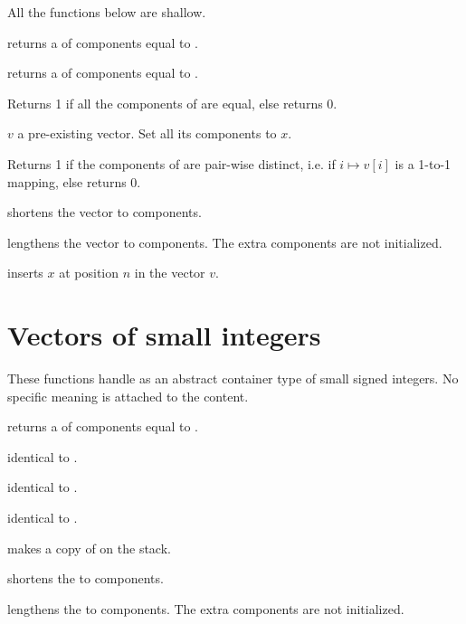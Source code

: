  All the functions below are shallow.

 returns a  of  components
equal to .

 returns a  of  components
equal to .

 Returns 1 if all the components of  are
equal, else returns 0.

 $v$ a pre-existing vector. Set all its
components to $x$.

  Returns 1 if the components of  are
pair-wise distinct, i.e. if $i\mapsto v[i]$ is a 1-to-1 mapping, else returns
0.

 shortens the vector  to 
components.

 lengthens the vector 
to  components. The extra components are not initialized.

 inserts $x$ at position $n$ in the vector
$v$.

\section{Vectors of small integers}


These functions handle  as an abstract container type
of small signed integers. No specific meaning is attached to the content.

 returns a 
of  components equal to .

 identical to .

 identical to .

 identical to .

 makes a copy of  on the stack.

 shortens the  
to  components.

 lengthens the 
 to  components. The extra components are not initialized.

